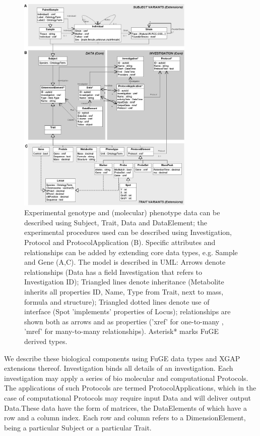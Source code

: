 \begin{figure}[ht!]
  \centering
  \includegraphics[width=0.75\textwidth]{eps/image_5_3.eps}
  \caption[XGAP.]
    {Experimental genotype and (molecular) phenotype data can be described using Subject, Trait, Data and DataElement; 
    the experimental procedures used can be described using Investigation, Protocol and ProtocolApplication (B). Specific 
    attributes and relationships can be added by extending core data types, e.g. Sample and Gene (A,C). The model is 
    described in UML: Arrows denote relationships (Data has a field Investigation that refers to Investigation ID); 
    Triangled lines denote inheritance (Metabolite inherits all properties ID, Name, Type from Trait, next to mass, 
    formula and structure); Triangled dotted lines denote use of interface (Spot 'implements' properties of Locus); 
    relationships are shown both as arrows and as properties ('xref' for one-to-many , 'mref' for many-to-many 
    relationships). Asterisk* marks FuGE derived types.}
    \label{fig:XGAP}
\end{figure}

We describe these biological components using FuGE data types and XGAP extensions thereof. 
Investigation binds all details of an investigation. Each investigation may apply a series 
of bio molecular \cite{Brown:2005} and computational \cite{Carey:2007,Alberts:2008,Fu:2007,Bhave:2007} 
Protocols. The applications of such Protocols are termed ProtocolApplications, which in the case 
of computational Protocols may require input Data and will deliver output Data.These data have the 
form of matrices, the DataElements of which have a row and a column index. Each row and column refers to a DimensionElement, 
being a particular Subject or a particular Trait. 

